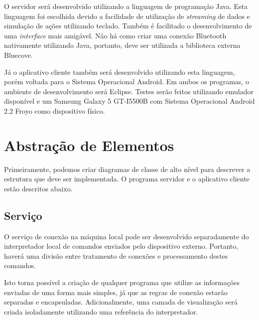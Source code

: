 \documentclass{article}
\begin{document}
O servidor será desenvolvido utilizando a linguagem de programação Java. Esta
linguagem foi escolhida devido a facilidade de utilização de \emph{streaming} de
dados e simulação de ações utilizando teclado. Também é facilitado o
desenvolvimento de uma \emph{interface} mais amigável. Não há como criar uma
conexão Bluetooth nativamente utilizando Java, portanto, deve ser utilizada a
biblioteca externa Bluecove.

Já o aplicativo cliente também será desenvolvido utilizando esta linguagem,
porém voltada para o Sistema Operacional Android. Em ambos os programas, o
ambiente de desenvolvimento será Eclipse. Testes serão feitos utilizando
emulador disponível e um Samsung Galaxy 5 GT-I5500B com Sistema Operacional
Android 2.2 Froyo como dispositivo físico.

\section{Abstração de Elementos}
\label{sec:abstracao}

Primeiramente, podemos criar diagramas de classe de alto nível para descrever a
estrutura que deve ser implementada. O programa servidor e o aplicativo cliente
estão descritos abaixo.

\subsection{Serviço}

O serviço de conexão na máquina local pode ser desenvolvido separadamente do
interpretador local de comandos enviados pelo dispositivo externo. Portanto,
haverá uma divisão entre tratamento de conexões e processamento destes comandos.

Isto torna possível a criação de qualquer programa que utilize as informações
enviadas de uma forma mais simples, já que as regras de conexão estarão
separadas e encapsuladas. Adicionalmente, uma camada de visualização será criada
isoladamente utilizando uma referência do interpretador.
\end{document}
